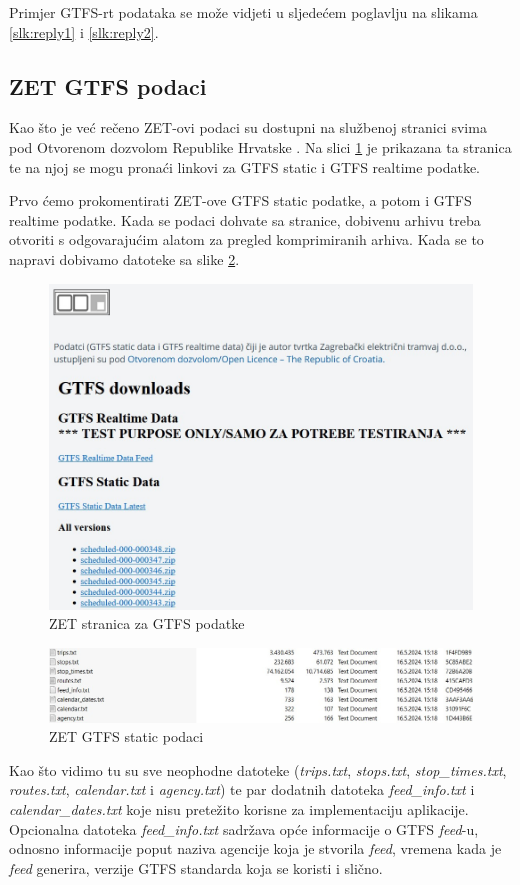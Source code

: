 \documentclass[zavrsnirad]{fer}
\begin{document}
Primjer GTFS-rt podataka se može vidjeti u sljedećem poglavlju na slikama \ref{slk:reply1} i \ref{slk:reply2}.

\subsection{ZET GTFS podaci}
\label{sec:zet-gtfs}

Kao što je već rečeno ZET-ovi podaci su dostupni na službenoj stranici svima pod Otvorenom dozvolom Republike Hrvatske \cite{ZET-GTFS}. Na slici \ref{slk:zet-stranica} je prikazana ta stranica te na njoj se mogu pronaći linkovi za GTFS static i GTFS realtime podatke.

Prvo ćemo prokomentirati ZET-ove GTFS static podatke, a potom i GTFS realtime podatke. Kada se podaci dohvate sa stranice, dobivenu arhivu treba otvoriti s odgovarajućim alatom za pregled komprimiranih arhiva. Kada se to napravi dobivamo datoteke sa slike \ref{slk:zet-podaci}.

\begin{figure}[htb]
	\centering
	\includegraphics[width=0.7\linewidth]{Figures/zet-stranica.jpg} 
	\caption{ZET stranica za GTFS podatke}
	\label{slk:zet-stranica}
\end{figure} 

\begin{figure}[htb]
	\centering
	\includegraphics[width=0.7\linewidth]{Figures/zet-podaci.jpg} 
	\caption{ZET GTFS static podaci}
	\label{slk:zet-podaci}
\end{figure} 

Kao što vidimo tu su sve neophodne datoteke (\textit{trips.txt}, \textit{stops.txt}, \textit{stop\_times.txt}, \textit{routes.txt}, \textit{calendar.txt} i \textit{agency.txt}) te par dodatnih datoteka \textit{feed\_info.txt} i \textit{calendar\_dates.txt} koje nisu pretežito korisne za implementaciju aplikacije. Opcionalna datoteka \textit{feed\_info.txt} sadržava opće informacije o GTFS \textit{feed}-u, odnosno  informacije poput naziva agencije koja je stvorila \textit{feed}, vremena kada je \textit{feed} generira, verzije GTFS standarda koja se koristi i slično.
\end{document}
